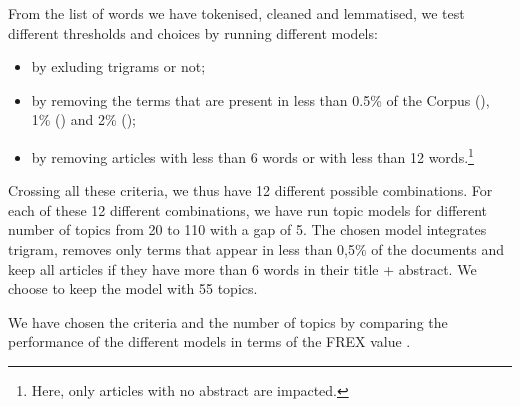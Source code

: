 \documentclass[]{elsarticle} %
\providecommand{\tightlist}{%
  \setlength{\itemsep}{0pt}\setlength{\parskip}{0pt}}
\begin{document}
From the list of words we have tokenised, cleaned and lemmatised, we
test different thresholds and choices by running different models:

\begin{itemize}
\tightlist
\item
  by exluding trigrams or not;
\item
  by removing the terms that are present in less than 0.5\% of the
  Corpus (), 1\% () and 2\% ();
\item
  by removing articles with less than 6 words or with less than 12
  words.\footnote{Here, only articles with no abstract are impacted.}
\end{itemize}

Crossing all these criteria, we thus have 12 different possible
combinations. For each of these 12 different combinations, we have run
topic models for different number of topics from 20 to 110 with a gap of
5. The chosen model integrates trigram, removes only terms that appear
in less than 0,5\% of the documents and keep all articles if they have
more than 6 words in their title + abstract. We choose to keep the model
with 55 topics.

We have chosen the criteria and the number of topics by comparing the
performance of the different models in terms of the FREX value
\citep{bischof2012}.
\end{document}
